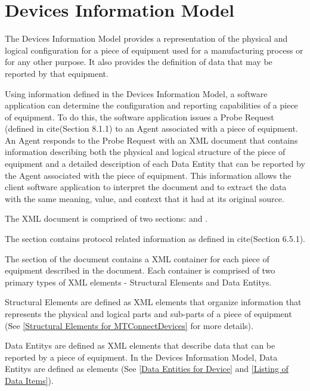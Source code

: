 
\section{Devices Information Model}
\label{sec:Devices Information Model}

The \gls{Devices Information Model} provides a representation of the physical and logical configuration for a piece of equipment used for a manufacturing process or for any other purpose.  It also provides the definition of data that may be reported by that equipment. 

Using information defined in the \gls{Devices Information Model}, a software application can determine the configuration and reporting capabilities of a piece of equipment.  To do this, the software application issues a \gls{Probe Request} (defined in  {{cite(Section 8.1.1)}} to an \gls{Agent} associated with a piece of equipment. An \gls{Agent} responds to the \gls{Probe Request} with an  \gls{XML} document that contains information describing both the physical and logical structure of the piece of equipment and a detailed description of each \gls{Data Entity} that can be reported by the \gls{Agent} associated with the piece of equipment.   This information allows the client software application to interpret the document and to extract the data with the same meaning, value, and context that it had at its original source.  

The  \gls{XML} document is comprised of two sections:  and .

The  section contains protocol related information as defined in  {{cite(Section 6.5.1)}}.

The  section of the  document contains a  \gls{XML} container for each piece of equipment described in the document.   Each  container is comprised of two primary types of \gls{XML} elements - \glspl{Structural Element} and \glspl{Data Entity}.  

\glspl{Structural Element} are defined as \gls{XML} elements that organize information that represents the physical and logical parts and sub-parts of a piece of equipment (See \ref{Structural Elements for MTConnectDevices} for more details).  

\glspl{Data Entity} are defined as \gls{XML} elements that describe data that can be reported by a piece of equipment.  In the \gls{Devices Information Model}, \glspl{Data Entity} are defined as  elements (See \ref{Data Entities for Device} and \ref{Listing of Data Items}).

